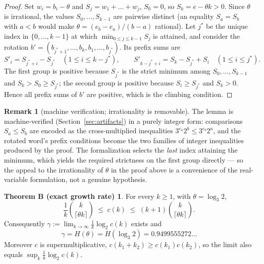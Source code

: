 \documentclass[11pt]{article}
\theoremstyle{definition}
\newtheorem{remark}[theorem]{Remark}
\newtheorem*{thmB}{Theorem B (exact growth rate)}
\newcommand{\ceil}[1]{\lceil #1\rceil}
\begin{document}
\begin{proof}
Set $w_i=b_i-\theta$ and $S_j=w_1+\dots+w_j$, $S_0=0$, so
$S_k=e-\theta k>0$. Since $\theta$ is irrational, the values
$S_0,\dots,S_{k-1}$ are pairwise distinct (an equality $S_a=S_b$ with
$a<b$ would make $\theta=(e_b-e_a)/(b-a)$ rational). Let $j^*$ be the
unique index in $\{0,\dots,k-1\}$ at which $\min_{0\le j\le k-1}S_j$ is
attained, and consider the rotation
$b'=(b_{j^*+1},\dots,b_k,b_1,\dots,b_{j^*})$. Its prefix sums are
\[
S'_i=S_{j^*+i}-S_{j^*}\quad (1\le i\le k-j^*),\qquad
S'_{k-j^*+i}=S_k-S_{j^*}+S_i \quad (1\le i\le j^*).
\]
The first group is positive because $S_{j^*}$ is the strict minimum among
$S_0,\dots,S_{k-1}$ and $S_k>S_0\ge S_{j^*}$; the second group is positive
because $S_i\ge S_{j^*}$ and $S_k>0$. Hence all prefix sums of $b'$ are
positive, which is the climbing condition.
\end{proof}

\begin{remark}[machine verification; irrationality is removable]
\label{rem:rotlean}
The lemma is machine-verified (Section~\ref{sec:artifacts}) in a purely
integer form: comparisons $S_a\le S_b$ are encoded as the cross-multiplied
inequalities $3^{e_a}2^{b}\le 3^{e_b}2^{a}$, and the rotated word's prefix
conditions become the two families of integer inequalities produced by the
proof. The formalization selects the \emph{last} index attaining the
minimum, which yields the required strictness on the first group directly
--- so the appeal to the irrationality of $\theta$ in the proof above is a
convenience of the real-variable formulation, not a genuine hypothesis.
\end{remark}

\begin{thmB}
For every $k\ge 1$, with $\theta=\log_3 2$,
\[
\frac1k\binom{k}{\ceil{\theta k}} \;\le\; c(k)\;\le\;(k+1)\binom{k}{\ceil{\theta k}} .
\]
Consequently $\gamma:=\lim_{k\to\infty}\frac1k\log_2 c(k)$ exists and
\[
\gamma=H(\theta)=H(\log_3 2)=0.9499555272\ldots
\]
Moreover $c$ is supermultiplicative, $c(k_1+k_2)\ge c(k_1)c(k_2)$, so the
limit also equals $\sup_k \frac1k \log_2 c(k)$.
\end{thmB}
\end{document}
